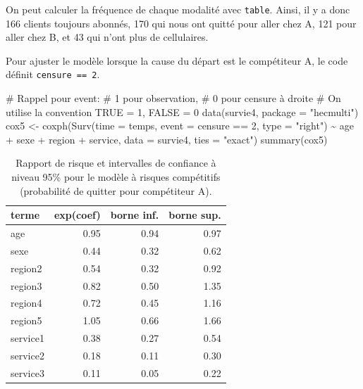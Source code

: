 \documentclass[
  11pt,
  letterpaper,
]{scrbook}
\newenvironment{Shaded}{\begin{snugshade}}{\end{snugshade}}
\newcommand{\AttributeTok}[1]{\textcolor[rgb]{0.40,0.45,0.13}{#1}}
\newcommand{\CommentTok}[1]{\textcolor[rgb]{0.37,0.37,0.37}{#1}}
\newcommand{\DecValTok}[1]{\textcolor[rgb]{0.68,0.00,0.00}{#1}}
\newcommand{\FunctionTok}[1]{\textcolor[rgb]{0.28,0.35,0.67}{#1}}
\newcommand{\NormalTok}[1]{\textcolor[rgb]{0.00,0.23,0.31}{#1}}
\newcommand{\OtherTok}[1]{\textcolor[rgb]{0.00,0.23,0.31}{#1}}
\newcommand{\SpecialCharTok}[1]{\textcolor[rgb]{0.37,0.37,0.37}{#1}}
\newcommand{\StringTok}[1]{\textcolor[rgb]{0.13,0.47,0.30}{#1}}
\theoremstyle{definition}
\theoremstyle{remark}
\begin{document}
On peut calculer la fréquence de chaque modalité avec \texttt{table}.
Ainsi, il y a donc 166 clients toujours abonnés, 170 qui nous ont quitté
pour aller chez A, 121 pour aller chez B, et 43 qui n'ont plus de
cellulaires.

Pour ajuster le modèle lorsque la cause du départ est le compétiteur A,
le code définit \texttt{censure\ ==\ 2}.

\begin{Shaded}
\begin{Highlighting}[]
\CommentTok{\# Rappel pour \textasciigrave{}event\textasciigrave{}:}
\CommentTok{\#   1 pour observation, }
\CommentTok{\#   0 pour censure à droite}
\CommentTok{\# On utilise la convention TRUE = 1, FALSE = 0}
\FunctionTok{data}\NormalTok{(survie4, }\AttributeTok{package =} \StringTok{"hecmulti"}\NormalTok{)}
\NormalTok{cox5 }\OtherTok{\textless{}{-}} \FunctionTok{coxph}\NormalTok{(}\FunctionTok{Surv}\NormalTok{(}\AttributeTok{time =}\NormalTok{ temps, }
                   \AttributeTok{event =}\NormalTok{ censure }\SpecialCharTok{==} \DecValTok{2}\NormalTok{,}
                   \AttributeTok{type =} \StringTok{"right"}\NormalTok{) }\SpecialCharTok{\textasciitilde{}} 
\NormalTok{                age }\SpecialCharTok{+}\NormalTok{ sexe }\SpecialCharTok{+}\NormalTok{ region }\SpecialCharTok{+}\NormalTok{ service, }
              \AttributeTok{data =}\NormalTok{ survie4,}
              \AttributeTok{ties =} \StringTok{"exact"}\NormalTok{)}
\FunctionTok{summary}\NormalTok{(cox5)}
\end{Highlighting}
\end{Shaded}

\hypertarget{tbl-cox-risquecompetA}{}
\begin{table}
\caption{\label{tbl-cox-risquecompetA}Rapport de risque et intervalles de confiance à niveau 95\% pour le
modèle à risques compétitifs (probabilité de quitter pour compétiteur
A). }\tabularnewline

\centering
\begin{tabular}{lrrr}
\toprule
terme & exp(coef) & borne inf. & borne sup.\\
\midrule
age & 0.95 & 0.94 & 0.97\\
sexe & 0.44 & 0.32 & 0.62\\
region2 & 0.54 & 0.32 & 0.92\\
region3 & 0.82 & 0.50 & 1.35\\
region4 & 0.72 & 0.45 & 1.16\\
\addlinespace
region5 & 1.05 & 0.66 & 1.66\\
service1 & 0.38 & 0.27 & 0.54\\
service2 & 0.18 & 0.11 & 0.30\\
service3 & 0.11 & 0.05 & 0.22\\
\bottomrule
\end{tabular}
\end{table}
\end{document}
